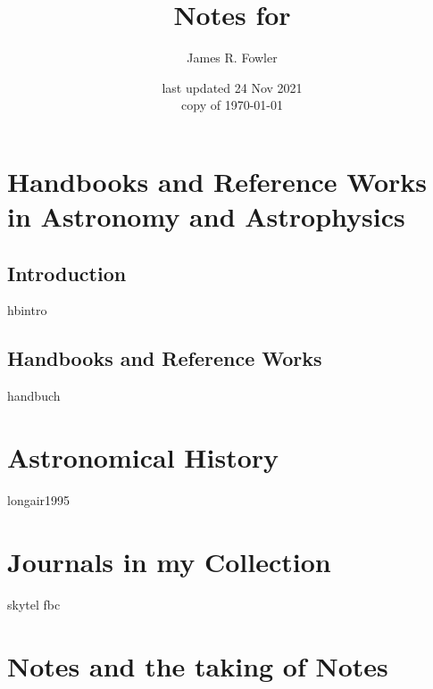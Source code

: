 \documentclass{book}
\begin{document}
\title{Notes for \ProjectTitle}
\author{James R. Fowler}
\date{last updated 24 Nov 2021\\ copy of \today}

\maketitle

\tableofcontents
\listoftables

\chapter{Handbooks and Reference Works in Astronomy and Astrophysics}
\section{Introduction}
{hbintro}

\section{Handbooks and Reference Works}
{handbuch}



\chapter{Astronomical History}
{longair1995}

\chapter{Journals in my Collection}
{skytel}
{fbc}

\chapter{Notes and the taking of Notes}
\end{document}
